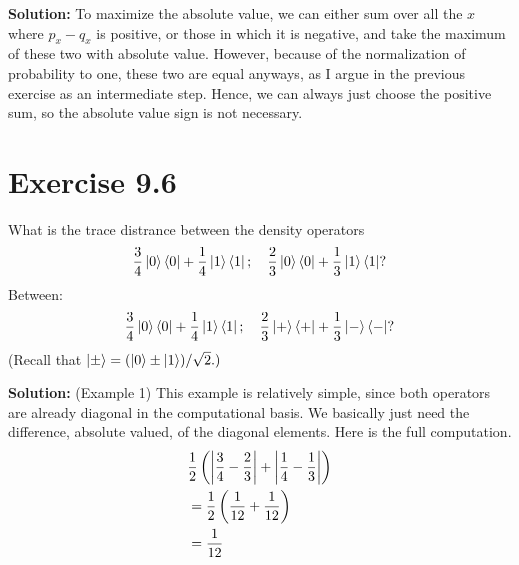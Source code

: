 \documentclass{book}
\begin{document}
    \textbf{Solution:} To maximize the absolute value, we can either sum over all the $x$ where $p_x-q_x$ is positive, or those in which it is negative, and take the maximum of these two with absolute value. However, because of the normalization of probability to one, these two are equal anyways, as I argue in the previous exercise as an intermediate step. Hence, we can always just choose the positive sum, so the absolute value sign is not necessary. 
    
\section*{Exercise 9.6}
    What is the trace distrance between the density operators
    \begin{align}
        \frac{3}{4}\ket{0}\bra{0}+\frac{1}{4}\ket{1}\bra{1};\quad \frac{2}{3}\ket{0}\bra{0}+\frac{1}{3}\ket{1}\bra{1}?
    \end{align}
    Between:
    \begin{align}
        \frac{3}{4}\ket{0}\bra{0}+\frac{1}{4}\ket{1}\bra{1};\quad \frac{2}{3}\ket{+}\bra{+}+\frac{1}{3}\ket{-}\bra{-}?
    \end{align}
    (Recall that $\ket{\pm} = (\ket{0}\pm\ket{1})/\sqrt{2}.)$
    
    \textbf{Solution:} (Example 1) This example is relatively simple, since both operators are already diagonal in the computational basis. We basically just need the difference, absolute valued, of the diagonal elements. Here is the full computation.
    \begin{align}
    \begin{aligned}
         &\frac{1}{2}\left(\abs{\frac{3}{4}-\frac{2}{3}}+\abs{\frac{1}{4}-\frac{1}{3}}\right) \\
         &= \frac{1}{2}\left(\frac{1}{12}+\frac{1}{12}\right) \\
         &= \frac{1}{12}
    \end{aligned}
    \end{align}
    
\end{document}
